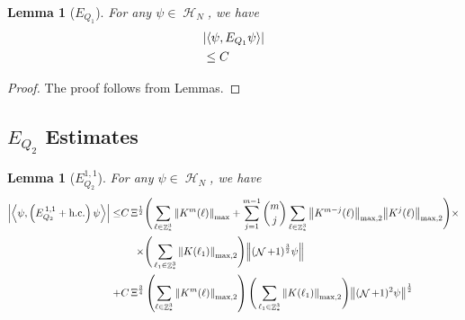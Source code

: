 \documentclass[sn-mathphys, Numbered ,a4paper]{sn-jnl}%
\DeclareMathOperator{\Z}{\mathbb{Z}}
\DeclareMathOperator{\HH}{\mathcal{H}}
\DeclareMathOperator{\NN}{\mathcal{N}}
\newcommand{\half}{\frac{1}{2}}
\newcommand{\eva}[1]{\left\langle #1 \right\rangle}
\theoremstyle{plain}
\newtheorem{lemma}[theorem]{Lemma}
\theoremstyle{definition}
\theoremstyle{remark}
\theoremstyle{plain}
\theoremstyle{definition}
\theoremstyle{remark}
\begin{document}
\begin{lemma}[$E_{Q_1}$]
	For any $\psi \in \HH_N$, we have
	\begin{align}
		&\abs{\eva{\psi, E_{Q_1}  \psi}}\nonumber\\&\leq C
	\end{align}
\end{lemma}
\begin{proof}
	The proof follows from Lemmas.
\end{proof}


\subsection{$E_{Q_2}$ Estimates}
\begin{lemma}[$E_{Q_2}^{1,1}$]
    For any $\psi \in \HH_N$, we have
    \begin{align}
    	\abs{\eva{\psi,\left(E^{\,1,1}_{Q_2}+\mathrm{h.c.}\right) \psi }}
    	 \leq  &C\, \begin{aligned}[t]\Xi^{\half}\Bigg( &\sum\limits_{\ell \in \Z^3_*} \norm{K^m(\ell)}_{\mathrm{max}} +\sum\limits_{j=1}^{m-1} {{m}\choose{j}} \sum\limits_{\ell \in \Z^3_*} \norm{K^{m-j}(\ell)}_{\mathrm{max,2}} \norm{K^{j}(\ell)}_{\mathrm{max,2}} \Bigg)\times \nonumber\\ \times \Bigg(&\sum\limits_{\ell_1 \in \Z^3_*} \norm{K(\ell_1)}_{\mathrm{max,2}} \Bigg)\norm { (\NN+1)^{\frac{3}{2}} \psi } \nonumber\\
    	 \end{aligned}\\
    	 \;+ &C\,\Xi^{\frac{3}{4}} \left(\sum\limits_{\ell \in \Z^3_*} \norm{K^m(\ell)}_{\mathrm{max,2}}\right) \Bigg(\sum\limits_{\ell_1 \in \Z^3_*} \norm{K(\ell_1)}_{\mathrm{max,2}} \Bigg)  \norm{ (\NN+1)^2\psi}^\half\label{eq:estEQ211}
    \end{align}
\end{lemma}
\end{document}
